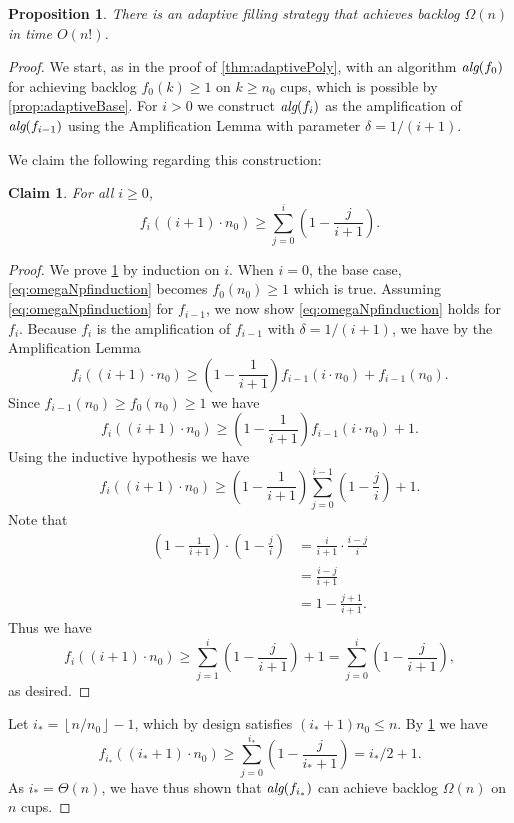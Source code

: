 \documentclass[twocolumn]{article}[10pt]
\newcommand{\alg}[1]{\textit{\text{alg}}({#1})}
\newcommand{\floor}[1]{\left\lfloor #1 \right\rfloor}
\newtheorem{proposition}{Proposition}
\newtheorem{clm}{Claim}
\begin{document}
\begin{proposition}
  \label{prop:factorialTimeAlg}
  There is an adaptive filling strategy that
  achieves backlog $\Omega(n)$ in time $O(n!)$.
\end{proposition}
\begin{proof}
  We start, as in the proof of \cref{thm:adaptivePoly}, with an
  algorithm $\alg{f_0}$ for
  achieving backlog $f_0(k) \ge 1$ on $k\ge n_0$ cups, which is
  possible by \cref{prop:adaptiveBase}. 
  For $i > 0$ we construct $\alg{f_{i}}$ as the
  amplification of $\alg{f_{i-1}}$ using the 
  Amplification Lemma with parameter $\delta = 1/(i+1)$. 

  We claim the following regarding this construction:
  \begin{clm}
    \label{clm:yayactuallygetn}
  For all $i\ge 0$,
  \begin{equation}
    \label{eq:omegaNpfinduction}
    f_i((i+1)\cdot n_0) \ge \sum_{j=0}^i \left(1-\frac{j}{i+1}\right).
  \end{equation}
  \end{clm}
  \begin{proof}
  We prove \cref{clm:yayactuallygetn} by induction on $i$. When $i=0$, the base case, \eqref{eq:omegaNpfinduction} becomes 
  $f_{0}(n_0) \ge 1$ which is true. Assuming
  \eqref{eq:omegaNpfinduction} for $f_{i-1}$, we now show
  \eqref{eq:omegaNpfinduction} holds for $f_{i}$.
  Because $f_{i}$ is the amplification of $f_{i-1}$ with $\delta = 1/(i+1)$, we have by the Amplification Lemma
  $$f_{i}((i+1)\cdot n_0) \ge \left(1 - \frac{1}{i+1}\right) f_{i-1}(i\cdot n_0) + f_{i-1}(n_0).$$
  Since $f_{i-1}(n_0) \ge f_0(n_0) \ge 1$ we have
  $$f_{i}((i+1)\cdot n_0) \ge \left(1 - \frac{1}{i+1}\right) f_{i-1}(i\cdot n_0) + 1.$$
  Using the inductive hypothesis we have
  $$f_{i}((i+1)\cdot n_0) \ge \left(1 - \frac{1}{i+1}\right)\sum_{j=0}^{i-1} \left(1-\frac{j}{i}\right) + 1.$$
  Note that 
  \begin{align*}
    \left(1 - \frac{1}{i+1}\right)\cdot \left(1-\frac{j}{i}\right) &= \frac{i}{i+1} \cdot \frac{i-j}{i} \\
  &= \frac{i-j}{i+1}\\
  &= 1 - \frac{j+1}{i+1}.
  \end{align*}
  Thus we have
  $$f_{i}((i+1)\cdot n_0) \ge \sum_{j=1}^{i} \left(1-\frac{j}{i+1}\right) + 1 = \sum_{j=0}^{i} \left(1-\frac{j}{i+1}\right),$$
  as desired.
  \end{proof}

  Let $i_* = \floor{n/n_0}-1$, which by design satisfies $(i_*+1)n_0 \le n$.
  By \cref{clm:yayactuallygetn} we have
  $$f_{i_*}((i_*+1)\cdot n_0) \ge \sum_{j=0}^{i_*} \left(1 - \frac{j}{i_*+1} \right) = i_*/2 + 1.$$
  As $i_* = \Theta(n)$, we have thus shown that $\alg{f_{i_*}}$ can achieve backlog $\Omega(n)$ on $n$ cups.


\end{proof}
\end{document}
